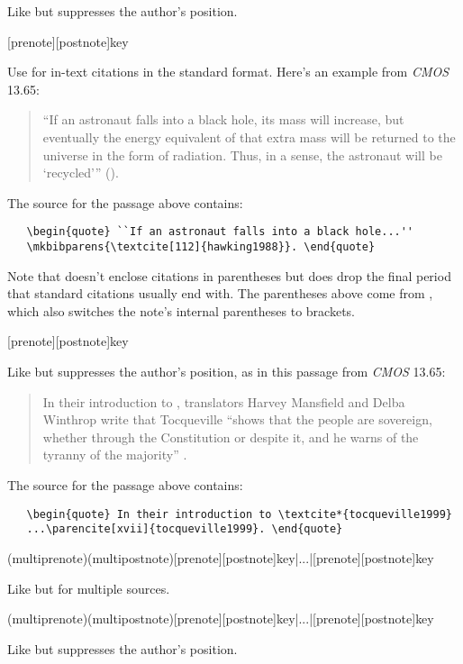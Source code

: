 \documentclass[11pt,letterpaper,oneside]{article}
\begin{document}
\begin{ltxsyntax}
Like  but suppresses the author's position.

[prenote][postnote]{key}

Use  for in-text citations in the standard format.
Here's an example from \textit{CMOS} 13.65:

\begin{quote} ``If an astronaut falls into a black hole, its mass will
increase, but eventually the energy equivalent of that extra mass will
be returned to the universe in the form of radiation. Thus, in a
sense, the astronaut will be {`recycled'}''
\mkbibparens{\textcite[112]{hawking1988}}. \end{quote}

The source for the passage above contains:

\begin{verbatim}
   \begin{quote} ``If an astronaut falls into a black hole...''
   \mkbibparens{\textcite[112]{hawking1988}}. \end{quote}
\end{verbatim}

Note that  doesn't enclose citations in parentheses but
does drop the final period that standard citations usually end with.
The parentheses above come from , which also switches
the note's internal parentheses to brackets.

[prenote][postnote]{key}

Like  but suppresses the author's position, as in this
passage from \textit{CMOS} 13.65:

\begin{quote} In their introduction to \textcite*{tocqueville1999},
translators Harvey Mansfield and Delba Winthrop write that Tocqueville
``shows that the people are sovereign, whether through the
Constitution or despite it, and he warns of the tyranny of the
majority'' \parencite[xvii]{tocqueville1999}. \end{quote}

The source for the passage above contains:

\begin{verbatim}
   \begin{quote} In their introduction to \textcite*{tocqueville1999}
   ...\parencite[xvii]{tocqueville1999}. \end{quote}
\end{verbatim}

(multiprenote)(multipostnote)[prenote][postnote]{key}|...|[prenote][postnote]{key}

Like  but for multiple sources.

(multiprenote)(multipostnote)[prenote][postnote]{key}|...|[prenote][postnote]{key}

Like  but suppresses the author's position.

\end{ltxsyntax}
\end{document}
